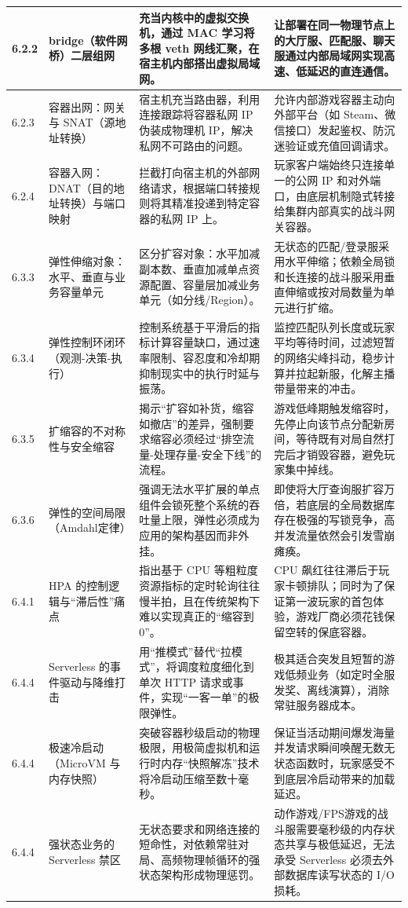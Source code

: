 \begin{longtable}{p{2.5cm}p{3cm}p{4.5cm}p{4.5cm}}
\hline
6.2.2 & bridge（软件网桥）二层组网 & 充当内核中的虚拟交换机，通过 MAC 学习将多根 veth 网线汇聚，在宿主机内部搭出虚拟局域网。 & 让部署在同一物理节点上的大厅服、匹配服、聊天服通过内部局域网实现高速、低延迟的直连通信。 \\
\hline
6.2.3 & 容器出网：网关与 SNAT（源地址转换） & 宿主机充当路由器，利用连接跟踪将容器私网 IP 伪装成物理机 IP，解决私网不可路由的问题。 & 允许内部游戏容器主动向外部平台（如 Steam、微信接口）发起鉴权、防沉迷验证或充值回调请求。 \\
\hline
6.2.4 & 容器入网：DNAT（目的地址转换）与端口映射 & 拦截打向宿主机的外部网络请求，根据端口转接规则将其精准投递到特定容器的私网 IP 上。 & 玩家客户端始终只连接单一的公网 IP 和对外端口，由底层机制隐式转接给集群内部真实的战斗网关容器。 \\
\hline
6.3.3 & 弹性伸缩对象：水平、垂直与业务容量单元 & 区分扩容对象：水平加减副本数、垂直加减单点资源配置、容量层加减业务单元（如分线/Region）。 & 无状态的匹配/登录服采用水平伸缩；依赖全局锁和长连接的战斗服采用垂直伸缩或按对局数量为单元进行扩缩。 \\
\hline
6.3.4 & 弹性控制环闭环（观测-决策-执行） & 控制系统基于平滑后的指标计算容量缺口，通过速率限制、容忍度和冷却期抑制现实中的执行时延与振荡。 & 监控匹配队列长度或玩家平均等待时间，过滤短暂的网络尖峰抖动，稳步计算并拉起新服，化解主播带量带来的冲击。 \\
\hline
6.3.5 & 扩缩容的不对称性与安全缩容 & 揭示“扩容如补货，缩容如撤店”的差异，强制要求缩容必须经过“排空流量-处理存量-安全下线”的流程。 & 游戏低峰期触发缩容时，先停止向该节点分配新房间，等待既有对局自然打完后才销毁容器，避免玩家集中掉线。 \\
\hline
6.3.6 & 弹性的空间局限（Amdahl定律） & 强调无法水平扩展的单点组件会锁死整个系统的吞吐量上限，弹性必须成为应用的架构基因而非外挂。 & 即使将大厅查询服扩容万倍，若底层的全局数据库存在极强的写锁竞争，高并发流量依然会引发雪崩瘫痪。 \\
\hline
6.4.1 & HPA 的控制逻辑与“滞后性”痛点 & 指出基于 CPU 等粗粒度资源指标的定时轮询往往慢半拍，且在传统架构下难以实现真正的“缩容到 0”。 & CPU 飙红往往滞后于玩家卡顿排队；同时为了保证第一波玩家的首包体验，游戏厂商必须花钱保留空转的保底容器。 \\
\hline
6.4.4 & Serverless 的事件驱动与降维打击 & 用“推模式”替代“拉模式”，将调度粒度细化到单次 HTTP 请求或事件，实现“一客一单”的极限弹性。 & 极其适合突发且短暂的游戏低频业务（如定时全服发奖、离线演算），消除常驻服务器成本。 \\
\hline
6.4.4 & 极速冷启动（MicroVM 与内存快照） & 突破容器秒级启动的物理极限，用极简虚拟机和运行时内存“快照解冻”技术将冷启动压缩至数十毫秒。 & 保证当活动期间爆发海量并发请求瞬间唤醒无数无状态函数时，玩家感受不到底层冷启动带来的加载延迟。 \\
\hline
6.4.4 & 强状态业务的 Serverless 禁区 & 无状态要求和网络连接的短命性，对依赖常驻对局、高频物理帧循环的强状态架构形成物理惩罚。 & 动作游戏/FPS游戏的战斗服需要毫秒级的内存状态共享与极低延迟，无法承受 Serverless 必须去外部数据库读写状态的 I/O 损耗。 \\


\end{longtable}

\newpage